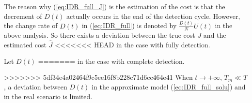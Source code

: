 The reason why (\ref{eq:IDR_full_J}) is the estimation of the cost
is that the decrement of $D(t)$ actually occurs in the end of the detection cycle.
However, the change rate of $D(t)$ in (\ref{eq:IDR_full})
is denoted by $\frac{D(t)}{N}U(t)$ in the above analysis.
So there exists a deviation between the true cost $J$ and the estimated cost $\hat{J}$
<<<<<<< HEAD
in the case with fully detection.
\begin{lem}\label{lem_1}
Let $D(t)$
=======
in the case with complete detection.
\begin{lem}
>>>>>>> 5df34e4a02464f9c5ee16f8b228c71d6cc464e41
When $t \rightarrow +\infty$, $T_{m} \ll T$,
a deviation between $D(t)$ in the approximate model (\ref{eq:IDR_full_solu})
and in the real scenario is limited.
\end{lem}


\end{lem}
